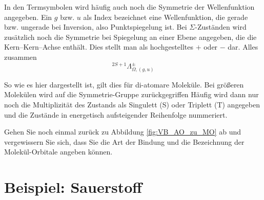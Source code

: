 

In den Termsymbolen wird häufig auch noch die Symmetrie der Wellenfunktion angegeben. Ein $g$ bzw. $u$ als Index bezeichnet eine Wellenfunktion, die gerade bzw. ungerade bei Inversion, also Punktspiegelung ist. Bei $\Sigma$-Zuständen wird zusätzlich noch die Symmetrie bei Spiegelung an einer Ebene angegeben, die die Kern--Kern--Achse enthält. Dies stellt man als hochgestelltes $+$ oder $-$ dar.
Alles zusammen
\begin{equation}
 ^{2 S + 1}\Lambda_{\Omega, (g,u)}^\pm
\end{equation}

So wie es hier dargestellt ist, gilt dies für di-atomare Moleküle. Bei größeren Molekülen wird auf die Symmetrie-Gruppe zurückgegriffen Häufig wird dann nur noch die Multiplizität des Zustands als Singulett (S) oder Triplett (T) angegeben und die Zustände in energetisch aufsteigender Reihenfolge nummeriert.

\begin{questions} 
\item Gehen Sie noch einmal zurück zu Abbildung \ref{fig:VB_AO_zu_MO} ab und vergewissern Sie sich, dass Sie die Art der Bindung und die Bezeichnung der Molekül-Orbitale angeben können.
\end{questions}


\section{Beispiel: Sauerstoff}

